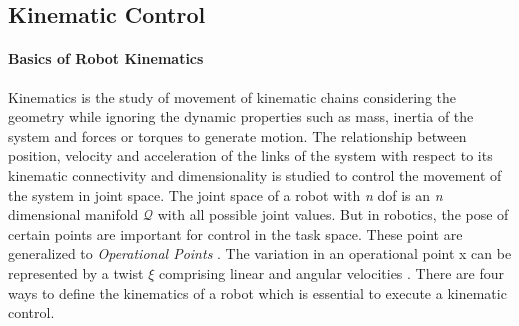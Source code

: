 \subsection{Kinematic Control}
\paragraph{Basics of Robot Kinematics}
Kinematics is the study of movement of kinematic chains considering the geometry while ignoring the dynamic properties such as mass, inertia of the system and forces or torques to generate motion. The relationship between position, velocity and acceleration of the links of the system with respect to its kinematic connectivity and dimensionality is studied to control the movement of the system in joint space. The joint space of a robot with \textit{n} dof is an \textit{n} dimensional manifold $\mathcal{Q}$ with all possible joint values. But in robotics, the pose of certain points are important for control in the task space. These point are generalized to \textit{Operational Points} \cite{Khatib1987}. The variation in an operational point x can be represented by a twist $\xi$ comprising linear and angular velocities \cite{featherstone2008rigid,Murray1994}. There are four ways to define the kinematics of a robot which is essential to execute a kinematic control.  
